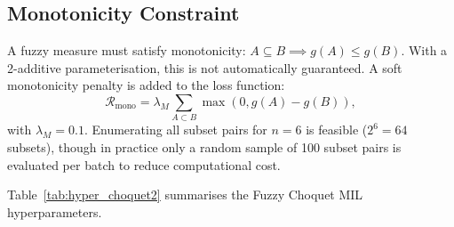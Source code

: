 \subsection{Monotonicity Constraint}
\label{sec:impl:choquet:monotonicity}

A fuzzy measure must satisfy monotonicity: $A \subseteq B \implies g(A) \leq g(B)$.
With a 2-additive parameterisation, this is not automatically guaranteed.
A soft monotonicity penalty is added to the loss function:
\begin{equation}
\label{eq:mono_penalty}
\mathcal{R}_{\text{mono}} = \lambda_M \sum_{A \subset B} \max(0, g(A) - g(B)),
\end{equation}
with $\lambda_M = 0.1$.
Enumerating all subset pairs for $n = 6$ is feasible ($2^6 = 64$ subsets), though in practice only a random sample of 100 subset pairs is evaluated per batch to reduce computational cost.

Table~\ref{tab:hyper_choquet2} summarises the Fuzzy Choquet MIL
hyperparameters.
 
